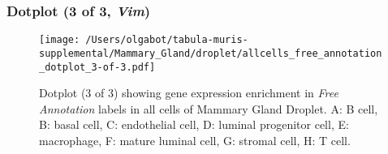 \clearpage

\subsubsection{Dotplot (3 of 3, \emph{Vim})}
\begin{figure}[h]
\centering
\texttt{[image: /Users/olgabot/tabula-muris-supplemental/Mammary\_Gland/droplet/allcells\_free\_annotation\_dotplot\_3-of-3.pdf]}

\caption{ Dotplot (3 of 3)  showing gene expression enrichment in \emph{Free Annotation} labels in all cells of Mammary Gland Droplet. A: B cell, B: basal cell, C: endothelial cell, D: luminal progenitor cell, E: macrophage, F: mature luminal cell, G: stromal cell, H: T cell.}
\end{figure}

